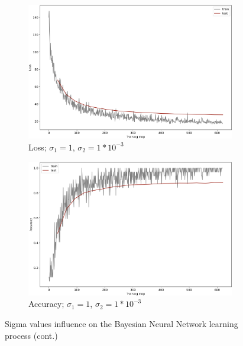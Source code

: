\begin{figure}[]
\begin{subfigure}[b]{0.48\textwidth}
         \includegraphics[width=\textwidth]{observational/img/bnn/sigmas/LC_s1_s0.001.png}
         \caption{Loss; $\sigma_1=1$, $\sigma_2=1*10^{-3}$}
     \end{subfigure}
     \hfill
     \begin{subfigure}[b]{0.48\textwidth}
         \centering
         \includegraphics[width=\textwidth]{observational/img/bnn/sigmas/AC_s1_s0.001.png}
         \caption{Accuracy; $\sigma_1=1$, $\sigma_2=1*10^{-3}$}
     \end{subfigure}
     \caption*{Sigma values influence on the Bayesian Neural Network learning process (cont.)}
\end{figure}